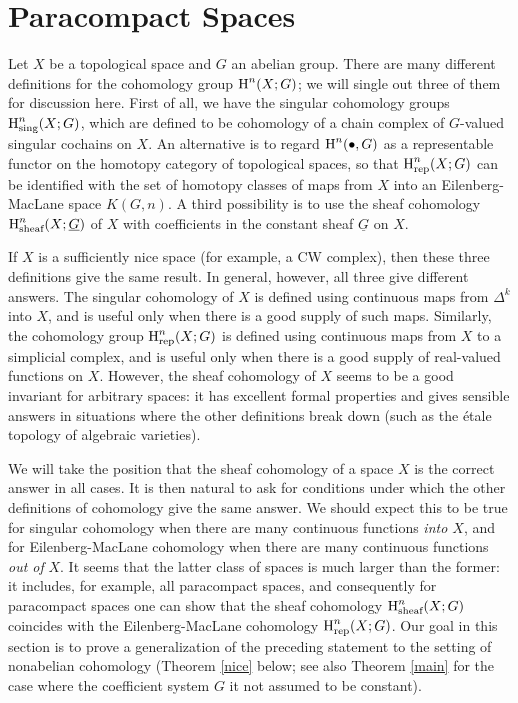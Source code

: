 
\section{Paracompact Spaces}\label{paracompactness}

\setcounter{theorem}{0}

Let $X$ be a topological space and $G$ an abelian group. There are
many different definitions for the cohomology group $\operatorname{H}^n(X;G)$;
we will single out three of them for discussion here. First of
all, we have the singular cohomology groups $\operatorname{H}^n_{\text{sing}}(X;G)$,
which are defined to be cohomology of a chain complex of $G$-valued
singular cochains on $X$. An alternative is to regard $\operatorname{H}^n( \bullet,
G)$ as a representable functor on the homotopy category of
topological spaces, so that $\operatorname{H}^n_{\text{rep}}(X;G)$ can be identified with the
set of homotopy classes of maps from $X$ into an Eilenberg-MacLane
space $K(G,n)$. A third possibility is to use the sheaf cohomology
$\operatorname{H}^n_{\text{sheaf}}(X; \underline{G})$ of $X$ with coefficients
in the constant sheaf $\underline{G}$ on $X$.

If $X$ is a sufficiently nice space (for example, a CW complex),
then these three definitions give the same result. In general, however,
all three give different answers. The singular cohomology of $X$ is defined using continuous maps from $\Delta^k$ into $X$, and is useful only when there is a good supply of such maps.
Similarly, the cohomology group $\operatorname{H}^{n}_{\text{rep}}(X;G)$ is defined using continuous maps
from $X$ to a simplicial complex, and is useful only when there is a good supply of
real-valued functions on $X$. However, the sheaf cohomology of $X$ seems to be
a good invariant for arbitrary spaces: it has excellent formal
properties and gives sensible answers in situations where the other definitions break down (such as the \'{e}tale topology of algebraic varieties).

We will take the position that the sheaf cohomology of a
space $X$ is the correct answer in all cases. It is then natural to ask
for conditions under which the other definitions of cohomology
give the same answer. We should expect this to be true for
singular cohomology when there are many continuous functions {\em
into $X$}, and for Eilenberg-MacLane cohomology when there are
many continuous functions {\em out of} $X$. It seems that the
latter class of spaces is much larger than the former: it
includes, for example, all paracompact spaces, and consequently
for paracompact spaces one can show that the sheaf cohomology
$\operatorname{H}^n_{\text{sheaf}}(X;G)$ coincides with the Eilenberg-MacLane
cohomology $\operatorname{H}^n_{\text{rep}}(X;G)$. Our goal in this section is to prove a generalization of the preceding statement to the setting of nonabelian cohomology (Theorem \ref{nice} below; see also Theorem \ref{main} for the case where the coefficient system $G$ it not assumed to be constant).

